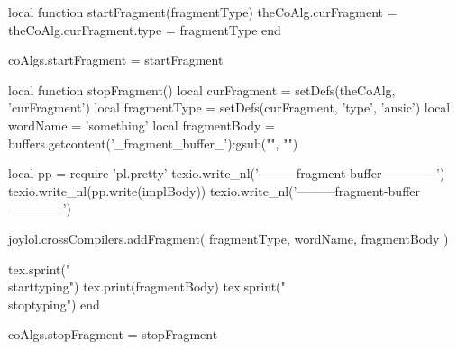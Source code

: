 \def\stopFragmentDone{
  \directlua{thirddata.joyLoLCoAlgs.stopFragment()}
}

\def\startFragment[#1]{
  \directlua{thirddata.joyLoLCoAlgs.startFragment('#1')}
  \buff_pickup{_fragment_buffer_}%
    {startFragment}{stopFragment}%
    {\relax}{\stopFragmentDone}\plusone%
}
\stopMkIVCode

\startLuaCode
local function startFragment(fragmentType)
  theCoAlg.curFragment      = { }
  theCoAlg.curFragment.type = fragmentType
end

coAlgs.startFragment = startFragment

local function stopFragment()
  local curFragment  = setDefs(theCoAlg, 'curFragment')
  local fragmentType = setDefs(curFragment, 'type', 'ansic')
  local wordName     = 'something'
  local fragmentBody = buffers.getcontent('_fragment_buffer_'):gsub("", "\n")

  local pp = require 'pl.pretty'
  texio.write_nl('---------fragment-buffer-------------')
  texio.write_nl(pp.write(implBody))
  texio.write_nl('---------fragment-buffer-------------')

  joylol.crossCompilers.addFragment(
    fragmentType,
    wordName,
    fragmentBody
  )

  tex.sprint("\\starttyping")
  tex.print(fragmentBody)
  tex.sprint("\\stoptyping")
end

coAlgs.stopFragment = stopFragment
\stopLuaCode

\stopTestSuite
